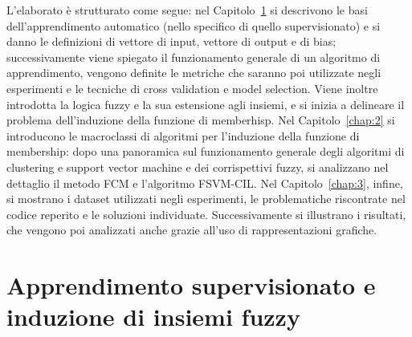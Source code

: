 \documentclass[oneside, openany]{book}
\begin{document}
		L'elaborato è strutturato come segue: nel Capitolo~\ref{chap:1} si descrivono le basi dell'apprendimento automatico (nello specifico di quello supervisionato) e si danno le definizioni di vettore di input, vettore di output e di bias; successivamente viene spiegato il funzionamento generale di un algoritmo di apprendimento, vengono definite le metriche che saranno poi utilizzate negli esperimenti e le tecniche di cross validation e model selection. Viene inoltre introdotta la logica fuzzy e la sua estensione agli insiemi, e si inizia a delineare il problema dell'induzione della funzione di memberhisp. Nel Capitolo~\ref{chap:2} si introducono le macroclassi di algoritmi per l'induzione della funzione di membership: dopo una panoramica sul funzionamento generale degli algoritmi di clustering e support vector machine e dei corrispettivi fuzzy, si analizzano nel dettaglio il metodo FCM e l'algoritmo FSVM-CIL. Nel Capitolo~\ref{chap:3}, infine, si mostrano i dataset utilizzati negli esperimenti, le problematiche riscontrate nel codice reperito e le soluzioni individuate. Successivamente si illustrano i risultati, che vengono poi analizzati anche grazie all'uso di rappresentazioni grafiche.
		
	\chapter[Apprendimento supervisionato]{Apprendimento supervisionato e induzione di insiemi fuzzy}
	\label{chap:1}
\end{document}
